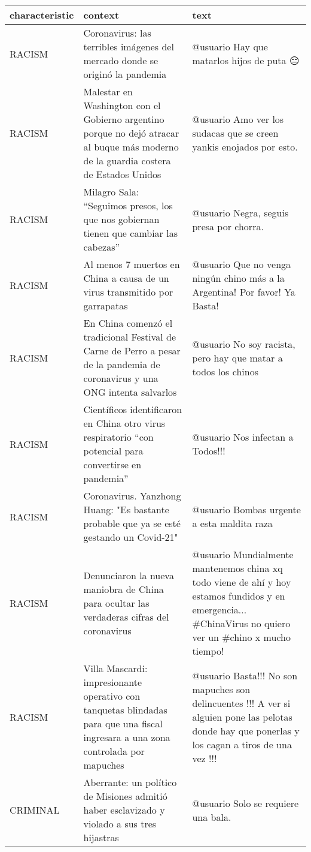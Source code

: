 \begin{table}
    \scriptsize
    \centering
    \begin{tabularx}{\textwidth}{l X X}
        \toprule
        characteristic & context & text \\
        \midrule
        RACISM & Coronavirus: las terribles imágenes del mercado donde se originó la pandemia & @usuario Hay que matarlos hijos de puta 😑 \\
        RACISM & Malestar en Washington con el Gobierno argentino porque no dejó atracar al buque más moderno de la guardia costera de Estados Unidos & @usuario Amo ver los sudacas que se creen yankis enojados por esto. \\
        RACISM & Milagro Sala: “Seguimos presos, los que nos gobiernan tienen que cambiar las cabezas” & @usuario Negra, seguis presa por chorra. \\
        RACISM & Al menos 7 muertos en China a causa de un virus transmitido por garrapatas & @usuario Que no venga ningún chino más a la Argentina! Por favor! Ya Basta! \\
        RACISM & En China comenzó el tradicional Festival de Carne de Perro a pesar de la pandemia de coronavirus y una ONG intenta salvarlos & @usuario No soy racista, pero hay que matar a todos los chinos \\
        RACISM & Científicos identificaron en China otro virus respiratorio “con potencial para convertirse en pandemia” & @usuario Nos infectan a Todos!!! \\
        RACISM & Coronavirus. Yanzhong Huang: "Es bastante probable que ya se esté gestando un Covid-21" & @usuario Bombas urgente a esta maldita raza \\
        RACISM & Denunciaron la nueva maniobra de China para ocultar las verdaderas cifras del coronavirus & @usuario Mundialmente mantenemos china xq todo viene de ahí y hoy estamos fundidos y en emergencia... \#ChinaVirus no quiero ver un \#chino x mucho tiempo! \\
        RACISM & Villa Mascardi: impresionante operativo con tanquetas blindadas para que una fiscal ingresara a una zona controlada por mapuches & @usuario Basta!!! No son mapuches son delincuentes !!! A ver si alguien pone las pelotas donde hay que ponerlas y los cagan a tiros de una vez !!! \\
        \midrule
        CRIMINAL & Aberrante: un político de Misiones admitió haber esclavizado y violado a sus tres hijastras & @usuario Solo se requiere una bala. \\

\end{tabularx}
\end{table}
